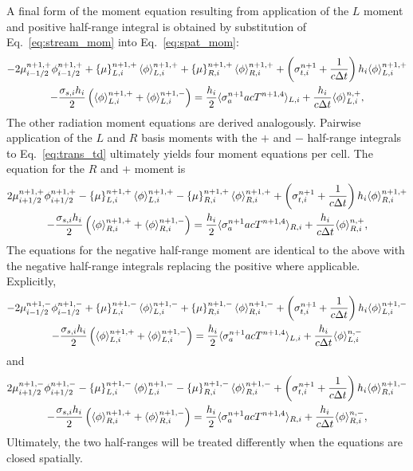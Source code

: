 A final form of the moment equation resulting from application of the $L$ moment and
positive half-range integral is obtained by substitution of 
Eq.~\eqref{eq:stream_mom} into Eq.~\eqref{eq:spat_mom}:
\begin{multline}\label{eq:exact_lmomp}
    -2{\mu}_{i-1/2}^{n+1,+} \phi_{i-1/2}^{n+1,+} + \left\{ \mu \right\}_{L,i}^{n+1,+}
  \langle \phi \rangle_{L,i}^{n+1,+}
  +  \left\{ \mu \right\}_{R,i}^{n+1,+}
  \langle \phi \rangle_{R,i}^{n+1,+} +  \left(\sigma_{t,i}^{n+1}+\frac{1}{c \Delta t} \right) h_i 
  \langle \phi \rangle_{L,i}^{n+1,+} \\-  \frac{\sigma_{s,i} h_i}{2} \left( \langle \phi \rangle_{L,i}^{n+1,+} +
  \langle \phi \rangle_{L,i}^{n+1,-}\right) = \frac{h_i}{2} \langle \sigma_a^{n+1} a c T^{n+1,4} \rangle_{L,i} +
  \frac{h_i}{c\Delta t}\langle \phi \rangle_{L,i}^{n,+},
\end{multline}
The other radiation moment equations are derived analogously.  
Pairwise application of the $L$ and $R$ basis
moments with the $+$ and $-$ half-range integrals to Eq.~\eqref{eq:trans_td} 
ultimately yields four moment
equations per cell.  The equation for the $R$ and $+$ moment is
\begin{multline}\label{eq:exact_rmomp}
    2{\mu}_{i+1/2}^{n+1,+} \phi_{i+1/2}^{n+1,+} - \left\{ \mu \right\}_{L,i}^{n+1,+}
  \langle \phi \rangle_{L,i}^{n+1,+}
  -  \left\{ \mu \right\}_{R,i}^{n+1,+}
  \langle \phi \rangle_{R,i}^{n+1,+} +  \left(\sigma_{t,i}^{n+1}+\frac{1}{c \Delta t} \right) h_i 
  \langle \phi \rangle_{R,i}^{n+1,+} \\-  \frac{\sigma_{s,i} h_i}{2} \left( \langle \phi \rangle_{R,i}^{n+1,+} +
  \langle \phi \rangle_{R,i}^{n+1,-}\right) = \frac{h_i}{2} \langle \sigma_a^{n+1} a c T^{n+1,4} \rangle_{R,i} +
  \frac{h_i}{c\Delta t}\langle \phi \rangle_{R,i}^{n,+},
\end{multline}
The equations for the negative half-range moment are identical to the above with the
negative half-range integrals replacing the positive where applicable.  Explicitly,
\begin{multline}\label{eq:exact_lmomm}
    -2{\mu}_{i-1/2}^{n+1,-} \phi_{i-1/2}^{n+1,-} + \left\{ \mu \right\}_{L,i}^{n+1,-}
  \langle \phi \rangle_{L,i}^{n+1,-}
  +  \left\{ \mu \right\}_{R,i}^{n+1,-}
  \langle \phi \rangle_{R,i}^{n+1,-} +  \left(\sigma_{t,i}^{n+1}+\frac{1}{c \Delta t} \right) h_i 
  \langle \phi \rangle_{L,i}^{n+1,-} \\-  \frac{\sigma_{s,i} h_i}{2} \left( \langle \phi \rangle_{L,i}^{n+1,+} +
  \langle \phi \rangle_{L,i}^{n+1,-}\right) = \frac{h_i}{2} \langle \sigma_a^{n+1} a c T^{n+1,4} \rangle_{L,i} +
  \frac{h_i}{c\Delta t}\langle \phi \rangle_{L,i}^{n,-}
\end{multline}
and
\begin{multline}\label{eq:exact_rmomm}
    2{\mu}_{i+1/2}^{n+1,-} \phi_{i+1/2}^{n+1,-} - \left\{ \mu \right\}_{L,i}^{n+1,-}
  \langle \phi \rangle_{L,i}^{n+1,-}
  -  \left\{ \mu \right\}_{R,i}^{n+1,-}
  \langle \phi \rangle_{R,i}^{n+1,-} +  \left(\sigma_{t,i}^{n+1}+\frac{1}{c \Delta t} \right) h_i 
  \langle \phi \rangle_{R,i}^{n+1,-} \\-  \frac{\sigma_{s,i} h_i}{2} \left( \langle \phi \rangle_{R,i}^{n+1,+} +
  \langle \phi \rangle_{R,i}^{n+1,-}\right) = \frac{h_i}{2} \langle \sigma_a^{n+1} a c T^{n+1,4} \rangle_{R,i} +
  \frac{h_i}{c\Delta t}\langle \phi \rangle_{R,i}^{n,-},
\end{multline}
Ultimately, the two half-ranges will be treated differently when the equations are closed
spatially.

